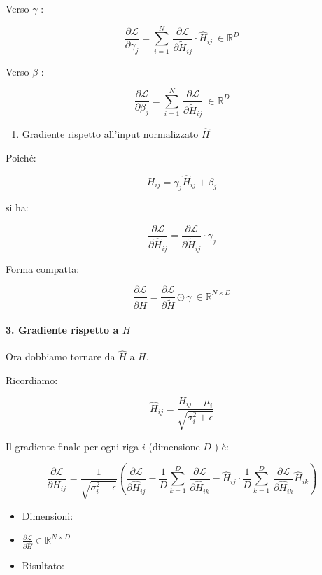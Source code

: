 \documentclass[
  11pt,
]{article}
\begin{document}
Verso \(\gamma\) :

\[\frac{\partial\mathcal{L}}{\partial\gamma_{j}} = \sum_{i = 1}^{N}\,\frac{\partial\mathcal{L}}{\partial{\widetilde{H}}_{ij}} \cdot {\widehat{H}}_{ij}\  \in \mathbb{R}^{D}\]

Verso \(\beta\) :

\[\frac{\partial\mathcal{L}}{\partial\beta_{j}} = \sum_{i = 1}^{N}\,\frac{\partial\mathcal{L}}{\partial{\widetilde{H}}_{ij}}\  \in \mathbb{R}^{D}\]

\begin{enumerate}
\def\labelenumi{\arabic{enumi}.}
\setcounter{enumi}{1}
\item
  Gradiente rispetto all'input normalizzato
  \(\widehat{H}\)
\end{enumerate}

Poiché:

\[{\widetilde{H}}_{ij} = \gamma_{j}{\widehat{H}}_{ij} + \beta_{j}\]

si ha:

\[\frac{\partial\mathcal{L}}{\partial{\widehat{H}}_{ij}} = \frac{\partial\mathcal{L}}{\partial{\widetilde{H}}_{ij}} \cdot \gamma_{j}\]

Forma compatta:

\[\frac{\partial\mathcal{L}}{\partial\widehat{H}} = \frac{\partial\mathcal{L}}{\partial\widetilde{H}} \odot \gamma\  \in \mathbb{R}^{N \times D}\]

\paragraph{3. Gradiente rispetto a $H$}

Ora dobbiamo tornare da \(\widehat{H}\) a \(H\).

Ricordiamo:

\[{\widehat{H}}_{ij} = \frac{H_{ij} - \mu_{i}}{\sqrt{\sigma_{i}^{2} + \epsilon}}\]

Il gradiente finale per ogni riga \(i\) (dimensione \(D\) ) è:

\[\frac{\partial\mathcal{L}}{\partial H_{ij}} = \frac{1}{\sqrt{\sigma_{i}^{2} + \epsilon}}\left( \frac{\partial\mathcal{L}}{\partial{\widehat{H}}_{ij}} - \frac{1}{D}\sum_{k = 1}^{D}\,\frac{\partial\mathcal{L}}{\partial{\widehat{H}}_{ik}} - {\widehat{H}}_{ij} \cdot \frac{1}{D}\sum_{k = 1}^{D}\,\frac{\partial\mathcal{L}}{\partial{\widehat{H}}_{ik}}{\widehat{H}}_{ik} \right)\]

\begin{itemize}
\item
  Dimensioni:
\item
  \(\frac{\partial\mathcal{L}}{\partial\widehat{H}} \in \mathbb{R}^{N \times D}\)
\item
  Risultato:
\end{itemize}
\end{document}

